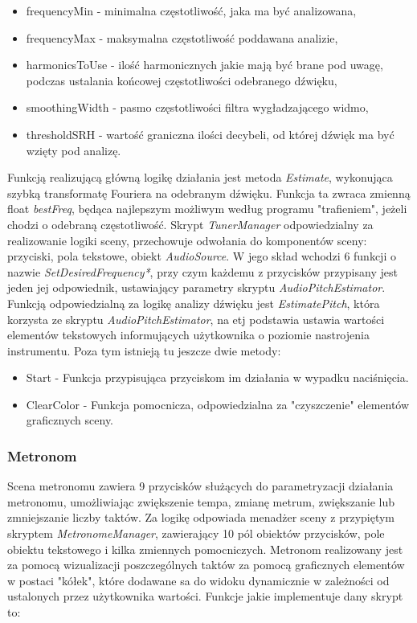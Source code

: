 \begin{itemize}
    \item frequencyMin - minimalna częstotliwość, jaka ma być analizowana,
    \item frequencyMax - maksymalna częstotliwość poddawana analizie,
    \item harmonicsToUse - ilość harmonicznych jakie mają być brane pod uwagę, podczas ustalania końcowej częstotliwości odebranego dźwięku,
    \item smoothingWidth - pasmo częstotliwości filtra wygładzającego widmo,
    \item thresholdSRH - wartość graniczna ilości decybeli, od której dźwięk ma być wzięty pod analizę.
\end{itemize}

Funkcją realizującą główną logikę działania jest metoda \emph{Estimate}, wykonująca szybką transformatę Fouriera na odebranym dźwięku. Funkcja ta zwraca zmienną float \emph{bestFreq}, będąca najlepszym możliwym według programu "trafieniem", jeżeli chodzi o odebraną częstotliwość. Skrypt \emph{TunerManager} odpowiedzialny za realizowanie logiki sceny, przechowuje odwołania do komponentów sceny: przyciski, pola tekstowe, obiekt \emph{AudioSource}. W jego skład wchodzi 6 funkcji o nazwie \emph{SetDesiredFrequency*}, przy czym każdemu z przycisków przypisany jest jeden jej odpowiednik, ustawiający parametry skryptu \emph{AudioPitchEstimator}. Funkcją odpowiedzialną za logikę analizy dźwięku jest \emph{EstimatePitch}, która korzysta ze skryptu \emph{AudioPitchEstimator}, na etj podstawia ustawia wartości elementów tekstowych informujących użytkownika o poziomie nastrojenia instrumentu. Poza tym istnieją tu jeszcze dwie metody:

\begin{itemize}
    \item Start - Funkcja przypisująca przyciskom im działania w wypadku naciśnięcia.
    \item ClearColor - Funkcja pomocnicza, odpowiedzialna za "czyszczenie" elementów graficznych sceny.
\end{itemize}

\subsubsection{Metronom}
Scena metronomu zawiera 9 przycisków służących do parametryzacji działania metronomu, umożliwiając zwiększenie tempa, zmianę metrum, zwiększanie lub zmniejszanie liczby taktów. Za logikę odpowiada menadżer sceny z przypiętym skryptem \emph{MetronomeManager}, zawierający 10 pól obiektów przycisków, pole obiektu tekstowego i kilka zmiennych pomocniczych. Metronom realizowany jest za pomocą wizualizacji poszczególnych taktów za pomocą graficznych elementów w postaci "kółek", które dodawane sa do widoku dynamicznie w zależności od ustalonych przez użytkownika wartości. Funkcje jakie implementuje dany skrypt to:

